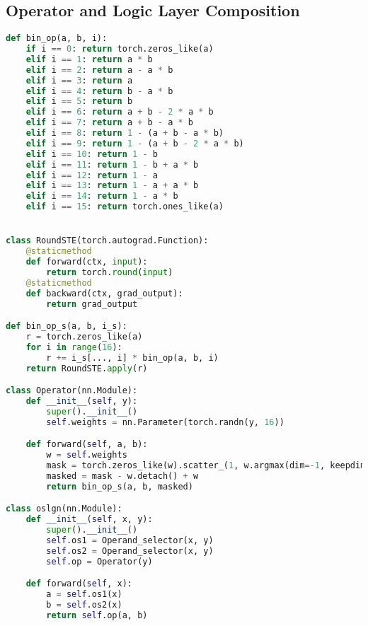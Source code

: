 \subsection{Operator and Logic Layer Composition}
\begin{lstlisting}[language=Python, caption={Operator routing and composition of logic layers.}]
def bin_op(a, b, i):
    if i == 0: return torch.zeros_like(a)
    elif i == 1: return a * b
    elif i == 2: return a - a * b
    elif i == 3: return a
    elif i == 4: return b - a * b
    elif i == 5: return b
    elif i == 6: return a + b - 2 * a * b
    elif i == 7: return a + b - a * b
    elif i == 8: return 1 - (a + b - a * b)
    elif i == 9: return 1 - (a + b - 2 * a * b)
    elif i == 10: return 1 - b
    elif i == 11: return 1 - b + a * b
    elif i == 12: return 1 - a
    elif i == 13: return 1 - a + a * b
    elif i == 14: return 1 - a * b
    elif i == 15: return torch.ones_like(a)


class RoundSTE(torch.autograd.Function):
    @staticmethod
    def forward(ctx, input):
        return torch.round(input)
    @staticmethod
    def backward(ctx, grad_output):
        return grad_output

def bin_op_s(a, b, i_s):
    r = torch.zeros_like(a)
    for i in range(16):
        r += i_s[..., i] * bin_op(a, b, i)
    return RoundSTE.apply(r)

class Operator(nn.Module):
    def __init__(self, y):
        super().__init__()
        self.weights = nn.Parameter(torch.randn(y, 16))

    def forward(self, a, b):
        w = self.weights
        mask = torch.zeros_like(w).scatter_(1, w.argmax(dim=-1, keepdim=True), 1.0)
        masked = mask - w.detach() + w
        return bin_op_s(a, b, masked)

class oslgn(nn.Module):
    def __init__(self, x, y):
        super().__init__()
        self.os1 = Operand_selector(x, y)
        self.os2 = Operand_selector(x, y)
        self.op = Operator(y)

    def forward(self, x):
        a = self.os1(x)
        b = self.os2(x)
        return self.op(a, b)
\end{lstlisting}
